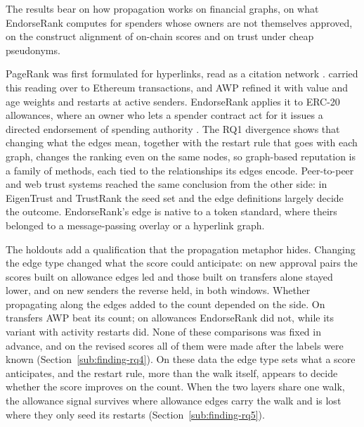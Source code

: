 
The results bear on how propagation works on financial graphs, on what EndorseRank computes for spenders whose owners are not themselves approved, on the construct alignment of on-chain scores and on trust under cheap pseudonyms.


PageRank was first formulated for hyperlinks, read as a citation network \parencite{page1999pagerank}. \textcite{do2023hodgerank} carried this reading over to Ethereum transactions, and AWP \parencite{do2023awp} refined it with value and age weights and restarts at active senders. EndorseRank applies it to ERC-20 allowances, where an owner who lets a spender contract act for it issues a directed endorsement of spending authority \parencite{vogelsteller2015erc20}. The RQ1 divergence shows that changing what the edges mean, together with the restart rule that goes with each graph, changes the ranking even on the same nodes, so graph-based reputation is a family of methods, each tied to the relationships its edges encode. Peer-to-peer and web trust systems reached the same conclusion from the other side: in EigenTrust \parencite{kamvar2003eigentrust} and TrustRank \parencite{gyongyi2004trustrank} the seed set and the edge definitions largely decide the outcome. EndorseRank's edge is native to a token standard, where theirs belonged to a message-passing overlay or a hyperlink graph.

The holdouts add a qualification that the propagation metaphor hides. Changing the edge type changed what the score could anticipate: on new approval pairs the scores built on allowance edges led and those built on transfers alone stayed lower, and on new senders the reverse held, in both windows. Whether propagating along the edges added to the count depended on the side. On transfers AWP beat its count; on allowances EndorseRank did not, while its variant with activity restarts did. None of these comparisons was fixed in advance, and on the revised scores all of them were made after the labels were known (Section~\ref{sub:finding-rq4}). On these data the edge type sets what a score anticipates, and the restart rule, more than the walk itself, appears to decide whether the score improves on the count. When the two layers share one walk, the allowance signal survives where allowance edges carry the walk and is lost where they only seed its restarts (Section~\ref{sub:finding-rq5}).

